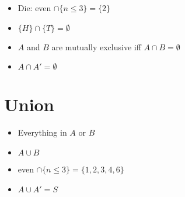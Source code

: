 \documentclass[12pt]{article}
\begin{document}
\begin{itemize}
	\item Die: even $\cap \{n\leq 3\} = \{2\}$
	\item $\{H\} \cap \{T\} = \emptyset$
	\item $A$ and $B$ are mutually exclusive iff $A \cap B = \emptyset$
	\item $A \cap A' = \emptyset$
\end{itemize}

\section{Union}

\begin{itemize}
	\item Everything in $A$ or $B$
	\item $A \cup B$
	\item even $\cap \{n \leq 3\} = \{1,2,3,4,6\}$
	\item $A \cup A' = S$
\end{itemize}
\end{document}
